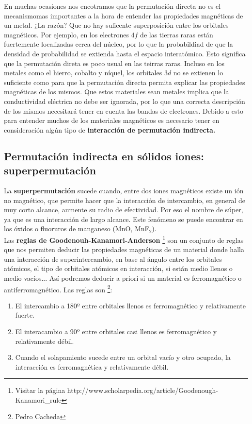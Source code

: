 \documentclass[12pt,a4paper]{book}
\numberwithin{equation}{section}
\numberwithin{figure}{section}
\begin{document}
En muchas ocasiones nos encotramos que la permutación directa no es el mecanismomas importantes a la hora de entender las propiedades magnéticas de un metal. ¿La razón? Que no hay suficente superposición entre los orbitales magnéticos. Por ejemplo, en los electrones $4f$ de las tierras raras están fuertemente localizadas cerca del núcleo, por lo que la probabildiad de que la densidad de probabilidad se extienda hasta el espacio interatómico. Esto significa que la permutación direta es poco usual en las teirras raras. Incluso en los metales como el hierro, cobalto y níquel, los orbitales $3d$ no se extienen lo suficiente como para que la permutación directa permita explicar las propiedades magnéticas de los mismos. Que estos materiales sean metales implica que la conductividad eléctrica no debe ser ignorada, por lo que una correcta descripción de los mismos necesitará tener en cuenta las bandas de electrones. Debido a esto para entender muchos de los materiales magnéticos es necesario tener en consideración algún tipo de \textbf{interacción de permutación indirecta.}

\subsection{Permutación indirecta en sólidos iones: superpermutación}

La \textbf{superpermutación} sucede cuando, entre dos iones magnéticos existe un ión no magnético, que permite hacer que la interacción de intercambio, en general de muy corto alcance, aumente su radio de efectividad. Por eso el nombre de súper, ya que es una interacción de largo alcance. Este fenómeno se puede encontrar en los óxidos o fluoruros de manganeso (MnO, MnF$_2$).  \\

Las \textbf{reglas de Goodenouh-Kanamori-Anderson} \footnote{Visitar la página http://www.scholarpedia.org/article/Goodenough-Kanamori\_rule} son un conjunto de reglas que nos permiten deducir las propiedades magnéticas de un material donde halla una interacción de superintercambio, en base al ángulo entre los orbitales atómicos, el tipo de orbitales atómicos en interacción, si están medio llenos o medio vacíos... Así podremos deducir a priori si un material es ferromagnético o antiferromagnético. Las reglas son \footnote{Pedro Cacheda}:

\begin{enumerate}
    \item El intercambio a 180º entre orbitales llenos es ferromagnético y relativamente fuerte.
    \item El interacambio a 90º entre orbitales casi llenos es ferromagnético y relativamente débil. 
    \item Cuando el solapamiento sucede entre un orbital vacío y otro ocupado, la interacción es ferromagnética y relativamente débil. 
\end{enumerate}
\end{document}
